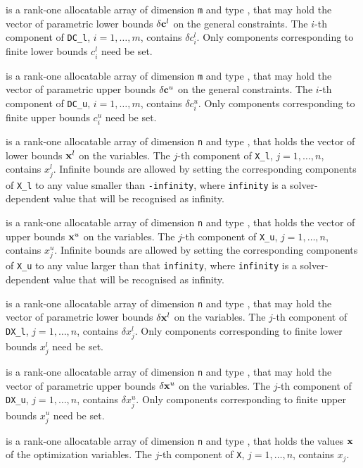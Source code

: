 \documentclass{galahad}
\begin{document}
\begin{description}
 is a rank-one allocatable array of dimension {\tt m} and type
\realdp, that may hold the vector of parametric lower bounds
$\delta {\mathbf{c}}^{l}$ on the general constraints. The $i$-th component of
{\tt DC\_l}, $i = 1, \ldots , m$, contains $\delta c_{i}^{l}$.
Only components corresponding to finite lower bounds $c_{i}^{l}$
need be set.

 is a rank-one allocatable array of dimension {\tt m} and type
\realdp, that may hold the vector of parametric upper bounds
$\delta {\mathbf{c}}^{u}$  on the general constraints. The $i$-th component of
{\tt DC\_u}, $i = 1,  \ldots ,  m$, contains $\delta c_{i}^{u}$.
Only components corresponding to finite upper bounds $c_{i}^{u}$
need be set.

 is a rank-one allocatable array of dimension {\tt n} and type
\realdp, that holds
the vector of lower bounds ${\mathbf{x}}^{l}$ on the variables.
The $j$-th component of {\tt X\_l}, $j = 1, \ldots , n$,
contains $x_{j}^{l}$.
Infinite bounds are allowed by setting the corresponding
components of {\tt X\_l} to any value smaller than {\tt -infinity},
where {\tt infinity} is a  solver-dependent value that will be recognised as
infinity.

 is a rank-one allocatable array of dimension {\tt n} and type
\realdp, that holds
the vector of upper bounds ${\mathbf{x}}^{u}$ on the variables.
The $j$-th component of {\tt X\_u}, $j = 1, \ldots , n$,
contains $x_{j}^{u}$.
Infinite bounds are allowed by setting the corresponding
components of {\tt X\_u} to any value larger than that {\tt infinity},
where {\tt infinity} is a  solver-dependent value that will be recognised as
infinity.

 is a rank-one allocatable array of dimension {\tt n} and type
\realdp, that may hold the vector of parametric lower bounds
$\delta {\mathbf{x}}^{l}$ on the variables. The $j$-th component of
{\tt DX\_l}, $j = 1, \ldots , n$, contains $\delta x_{j}^{l}$.
Only components corresponding to finite lower bounds $x_{j}^{l}$
need be set.

 is a rank-one allocatable array of dimension {\tt n} and type
\realdp, that may hold the vector of parametric upper bounds
$\delta {\mathbf{x}}^{u}$  on the variables. The $j$-th component of
{\tt DX\_u}, $j = 1,  \ldots ,  n$, contains $\delta x_{j}^{u}$.
Only components corresponding to finite upper bounds $x_{j}^{u}$
need be set.

 is a rank-one allocatable array of dimension {\tt n} and type
\realdp,
that holds the values ${\mathbf{x}}$ of the optimization variables.
The $j$-th component of {\tt X}, $j = 1,  \ldots , n$, contains $x_{j}$.


\end{description}
\end{document}
